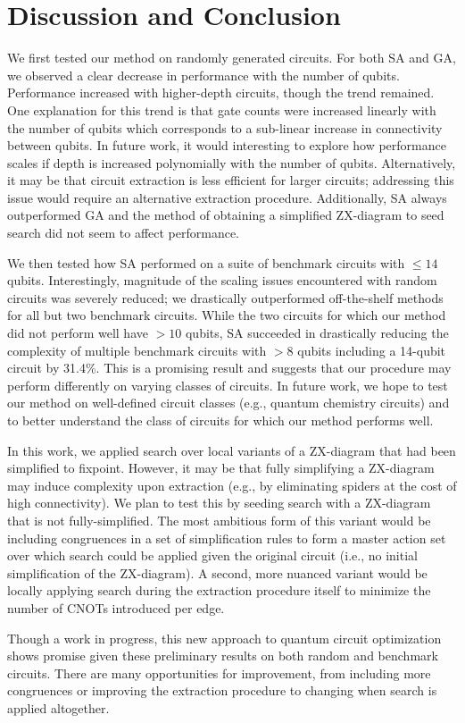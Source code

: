 \chapter[Discussion and Conclusion]{Discussion and Conclusion} \label{ch:discuss-conc}

We first tested our method on randomly generated circuits.
For both SA and GA, we observed a clear decrease in performance with the number of qubits.
Performance increased with higher-depth circuits, though the trend remained.
One explanation for this trend is that gate counts were increased linearly with the number of qubits which corresponds to a sub-linear increase in connectivity between qubits.
In future work, it would interesting to explore how performance scales if depth is increased polynomially with the number of qubits.
Alternatively, it may be that circuit extraction is less efficient for larger circuits;
addressing this issue would require an alternative extraction procedure.
Additionally, SA always outperformed GA and the method of obtaining a simplified ZX-diagram to seed search did not seem to affect performance.

We then tested how SA performed on a suite of benchmark circuits with $\leq 14$ qubits.
Interestingly, magnitude of the scaling issues encountered with random circuits was severely reduced;
we drastically outperformed off-the-shelf methods for all but two benchmark circuits.
While the two circuits for which our method did not perform well have $>10$ qubits, SA succeeded in drastically reducing the complexity of multiple benchmark circuits with $>8$ qubits including a 14-qubit circuit by 31.4\%.
This is a promising result and suggests that our procedure may perform differently on varying classes of circuits.
In future work, we hope to test our method on well-defined circuit classes (e.g., quantum chemistry circuits) and to better understand the class of circuits for which our method performs well.


In this work, we applied search over local variants of a ZX-diagram that had been simplified to fixpoint.
However, it may be that fully simplifying a ZX-diagram may induce complexity upon extraction (e.g., by eliminating spiders at the cost of high connectivity).
We plan to test this by seeding search with a ZX-diagram that is not fully-simplified.
The most ambitious form of this variant would be including congruences in a set of simplification rules to form a master action set over which search could be applied given the original circuit (i.e., no initial simplification of the ZX-diagram).
A second, more nuanced variant would be locally applying search during the extraction procedure itself to minimize the number of CNOTs introduced per edge.

Though a work in progress, this new approach to quantum circuit optimization shows promise given these preliminary results on both random and benchmark circuits.
There are many opportunities for improvement, from including more congruences or improving the extraction procedure to changing when search is applied altogether.
